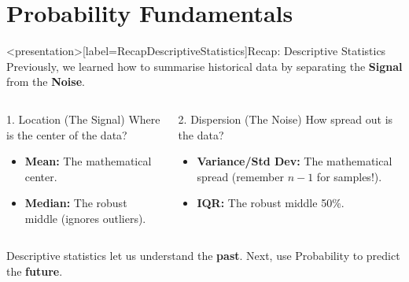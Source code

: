 \part{Probability Fundamentals}

\begin{frame}<presentation>[label=RecapDescriptiveStatistics]{Recap: Descriptive Statistics}
    Previously, we learned how to summarise historical data by separating the \textbf{Signal} from the \textbf{Noise}.

    \vspace{0.2cm}
    \begin{columns}[t]
        \begin{block}{1. Location (The Signal)}
            Where is the center of the data?
            \begin{itemize}
                \item \textbf{Mean:} The mathematical center.
                \item \textbf{Median:} The robust middle (ignores outliers).
            \end{itemize}
        \end{block}

        \begin{block}{2. Dispersion (The Noise)}
            How spread out is the data?
            \begin{itemize}
                \item \textbf{Variance/Std Dev:} The mathematical spread (remember $n-1$ for samples!).
                \item \textbf{IQR:} The robust middle 50\%.
            \end{itemize}
        \end{block}
    \end{columns}

  \vspace{0.4cm}
    Descriptive statistics let us understand the \textbf{past}. Next, use Probability to predict the \textbf{future}.
\end{frame}

